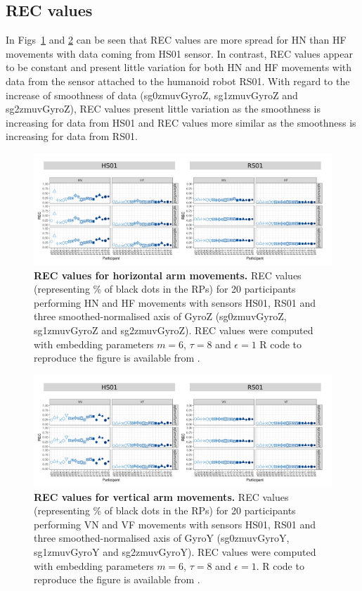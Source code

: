 \subsection{REC values}
In Figs~\ref{fig:rec_aH} and \ref{fig:rec_aV} can be seen that REC values 
are more spread for HN than HF movements with data coming from HS01 sensor. 
In contrast, REC values appear to be constant and present 
little variation for both HN and HF movements 
with data from the sensor attached to the humanoid robot RS01.
With regard to the increase of smoothness of data (sg0zmuvGyroZ, sg1zmuvGyroZ and sg2zmuvGyroZ), 
REC values present little variation as the smoothness is increasing for data 
from HS01 and REC values more similar as the smoothness is increasing for data from RS01.
\begin{figure}[!h]
\centering
\includegraphics[width=1.0\textwidth]{rec_aH}
    \caption{
	{\bf REC values for horizontal arm movements.}	
	REC values (representing \% of black dots in the RPs) for 
	20 participants performing HN and HF movements
	with sensors HS01, RS01 and three smoothed-normalised axis 
	of GyroZ (sg0zmuvGyroZ, sg1zmuvGyroZ and sg2zmuvGyroZ).
	REC values were computed with 
	embedding parameters $m=6$, $\tau=8$ and $\epsilon=1$
	R code to reproduce the figure is available from \cite{hwum2018}.
        }
    \label{fig:rec_aH}
\end{figure}
\begin{figure}[!h]
\centering
\includegraphics[width=1.0\textwidth]{rec_aV}
    \caption{
	{\bf REC values for vertical arm movements.}	
	REC values (representing \% of black dots in the RPs) for 
	20 participants performing VN and VF movements
	with sensors HS01, RS01 and three smoothed-normalised axis 
	of GyroY (sg0zmuvGyroY, sg1zmuvGyroY and sg2zmuvGyroY).
	REC values were computed with 
	embedding parameters $m=6$, $\tau=8$ and $\epsilon=1$.
	R code to reproduce the figure is available from \cite{hwum2018}.
        }
    \label{fig:rec_aV}
\end{figure}
